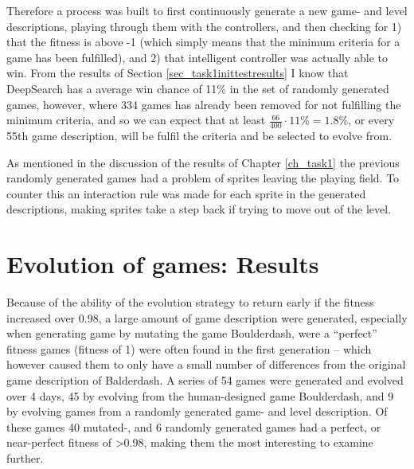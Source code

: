\documentclass[a4paper,titlepage,final]{report}
\begin{document}
Therefore a process was built to first continuously generate a new game- and level descriptions, playing through them with the controllers, and then checking for 1) that the fitness is above -1 (which simply means that the minimum criteria for a game has been fulfilled), and 2) that intelligent controller was actually able to win.
From the results of Section \ref{sec_task1inittestresults} I know that DeepSearch has a average win chance of 11\% in the set of randomly generated games, however, where 334 games has already been removed for not fulfilling the minimum criteria, and so we can expect that at least $\frac{66}{400}\cdot 11\% = 1.8\%$, or every 55th game description, will be fulfil the criteria and be selected to evolve from.

As mentioned in the discussion of the results of Chapter \ref{ch_task1} the previous randomly generated games had a problem of sprites leaving the playing field.
To counter this an interaction rule was made for each sprite in the generated descriptions, making sprites take a step back if trying to move out of the level.

%
%
%


\section{Evolution of games: Results}
\label{sec_task2evolvingGames}
Because of the ability of the evolution strategy to return early if the fitness increased over 0.98, a large amount of game description were generated, especially when generating game by mutating the game Boulderdash, were a ``perfect'' fitness games (fitness of 1) were often found in the first generation -- which however caused them to only have a small number of differences from the original game description of Balderdash.
A series of 54 games were generated and evolved over 4 days, 45 by evolving from the human-designed game Boulderdash, and 9 by evolving games from a randomly generated game- and level description.
Of these games 40 mutated-, and 6 randomly generated games had a perfect, or near-perfect fitness of >0.98, making them the most interesting to examine further.
\end{document}
